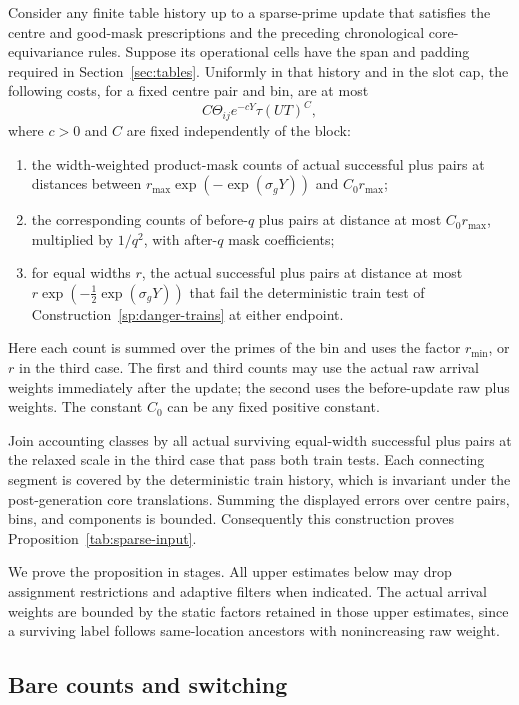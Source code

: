 \begin{proposition}\label{sp:sparse-estimates}
Consider any finite table history up to a sparse-prime update that satisfies
the centre and good-mask prescriptions and the preceding chronological
core-equivariance rules.  Suppose its operational cells have the span and
padding required in Section~\ref{sec:tables}.  Uniformly in that history
and in the slot cap, the following costs, for a fixed centre pair and bin,
are at most
\[
 C\Theta_{ij}e^{-cY}\tau(UT)^C,
\]
where $c>0$ and $C$ are fixed independently of the block:
\begin{enumerate}
 \item the width-weighted product-mask counts of actual successful plus
 pairs at distances between
 $r_{\max}\exp(-\exp(\sigma_gY))$ and $C_0r_{\max}$;
 \item the corresponding counts of before-$q$ plus pairs at distance at
 most $C_0r_{\max}$, multiplied by $1/q^2$, with after-$q$ mask coefficients;
 \item for equal widths $r$, the actual successful plus pairs at distance
 at most $r\exp(-\tfrac12\exp(\sigma_gY))$ that fail the deterministic
 train test of Construction~\ref{sp:danger-trains} at either endpoint.
\end{enumerate}
Here each count is summed over the primes of the bin and uses the factor
$r_{\min}$, or $r$ in the third case.  The first and third counts may use
the actual raw arrival weights immediately after the update; the second
uses the before-update raw plus weights.  The constant $C_0$ can be any
fixed positive constant.

Join accounting classes by all actual surviving equal-width successful
plus pairs at the relaxed scale in the third case that pass both train
tests.  Each connecting segment is covered by the deterministic train
history, which is invariant under the post-generation core translations.
Summing the displayed errors over centre pairs, bins, and components is
bounded.  Consequently this construction proves
Proposition~\ref{tab:sparse-input}.
\end{proposition}

We prove the proposition in stages.  All upper estimates below may drop
assignment restrictions and adaptive filters when indicated.  The actual
arrival weights are bounded by the static factors retained in those upper
estimates, since a surviving label follows same-location ancestors with
nonincreasing raw weight.

\subsection{Bare counts and switching}

